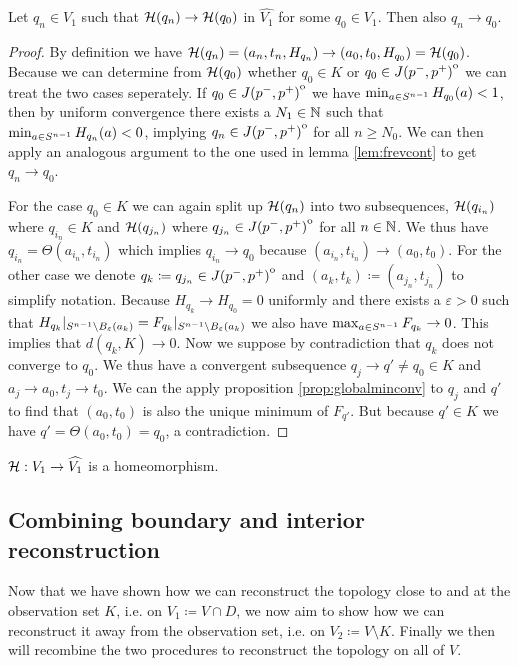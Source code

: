 \begin{lemma}
    Let $q_n \in V_1$ such that ${\mathcal{H}}(q_n)\to {\mathcal{H}}(q_0)$ in $\widehat{V_1}$ for some $q_0\in V_1$. Then also $q_n \to q_0$.
\end{lemma}
\begin{proof}
    By definition we have ${\mathcal{H}}(q_n) = (a_n,t_n,H_{q_n}) \to (a_0,t_0,H_{q_0}) = {\mathcal{H}}(q_0)$. Because we can determine from ${\mathcal{H}}(q_0)$ whether $q_0\in K$ or $q_0\in {\kern0ptJ(p^-,p^+)}^{\mathrm{o}}$ we can treat the two cases seperately. 
    If $q_0\in {\kern0ptJ(p^-,p^+)}^{\mathrm{o}}$ we have $\min_{a\in {S^{n-1}}} H_{q_0}(a) < 1$, then by uniform convergence there exists a $N_1\in \mathbb{N}$ such that $\min_{a\in {S^{n-1}}} H_{q_n}(a)<0$, implying $q_n\in {\kern0ptJ(p^-,p^+)}^{\mathrm{o}}$ for all $n \ge N_0$. We can then apply an analogous argument to the one used in lemma \ref{lem:frevcont} to get $q_n \to q_0$.

    For the case $q_0\in K$ we can again split up ${\mathcal{H}}(q_n)$ into two subsequences, ${\mathcal{H}}(q_{i_n})$ where $q_{i_n}\in K$ and ${\mathcal{H}}(q_{j_n})$ where $q_{j_n}\in {\kern0ptJ(p^-,p^+)}^{\mathrm{o}}$ for all $n\in \mathbb{N}$. We thus have $q_{i_n}=\Theta(a_{i_n},t_{i_n})$ which implies $q_{i_n}\to q_0$ because $(a_{i_n},t_{i_n}) \to (a_0,t_0)$. For the other case we denote $q_k\coloneqq q_{j_n}\in {\kern0ptJ(p^-,p^+)}^{\mathrm{o}}$ and $(a_k,t_k)\coloneqq (a_{j_n},t_{j_n})$ to simplify notation. Because $H_{q_k}\to H_{q_0}=0$ uniformly and there exists a $\varepsilon>0$ such that $H_{q_k}\rvert_{{S^{n-1}}\setminus B_\varepsilon(a_k)} = F_{q_k}\rvert_{{S^{n-1}}\setminus B_\varepsilon(a_k)}$ we also have $\max_{a\in {S^{n-1}}} F_{q_k}\to 0$. This implies that $d(q_k, K)\to 0$. Now we suppose by contradiction that $q_k$ does not converge to $q_0$. We thus have a convergent subsequence $q_j\to q'\neq q_0\in K$ and $a_j\to a_0, t_j\to t_0$. We can the apply proposition \ref{prop:globalminconv} to $q_j$ and $q'$ to find that $(a_0,t_0)$ is also the unique minimum of $F_{q'}$. But because $q'\in K$ we have $q' = \Theta(a_0,t_0) = q_0$, a contradiction.
\end{proof}

\begin{corollary}\label{cor:Hhomeo}
    ${\mathcal{H}}:V_1 \to \widehat{V_1}$ is a homeomorphism.
\end{corollary}

\subsection{Combining boundary and interior reconstruction}
Now that we have shown how we can reconstruct the topology close to and at the observation set $K$, i.e. on $V_1\coloneqq V\cap D$, we now aim to show how we can reconstruct it away from the observation set, i.e. on $V_2\coloneqq V \setminus K$. Finally we then will recombine the two procedures to reconstruct the topology on all of $V$.

